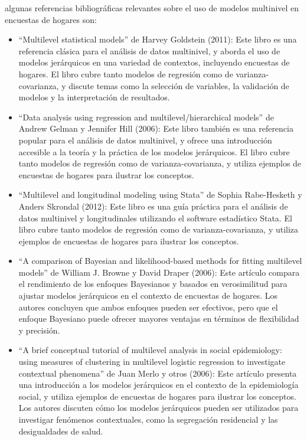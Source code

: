 \documentclass[
  spanish,
  12pt,
]{book}
\begin{document}
algunas referencias bibliográficas relevantes sobre el uso de modelos multinivel en encuestas de hogares son:

\begin{itemize}
\item
  ``Multilevel statistical models'' de Harvey Goldstein (2011): Este libro es una referencia clásica para el análisis de datos multinivel, y aborda el uso de modelos jerárquicos en una variedad de contextos, incluyendo encuestas de hogares. El libro cubre tanto modelos de regresión como de varianza-covarianza, y discute temas como la selección de variables, la validación de modelos y la interpretación de resultados.
\item
  ``Data analysis using regression and multilevel/hierarchical models'' de Andrew Gelman y Jennifer Hill (2006): Este libro también es una referencia popular para el análisis de datos multinivel, y ofrece una introducción accesible a la teoría y la práctica de los modelos jerárquicos. El libro cubre tanto modelos de regresión como de varianza-covarianza, y utiliza ejemplos de encuestas de hogares para ilustrar los conceptos.
\item
  ``Multilevel and longitudinal modeling using Stata'' de Sophia Rabe-Hesketh y Anders Skrondal (2012): Este libro es una guía práctica para el análisis de datos multinivel y longitudinales utilizando el software estadístico Stata. El libro cubre tanto modelos de regresión como de varianza-covarianza, y utiliza ejemplos de encuestas de hogares para ilustrar los conceptos.
\item
  ``A comparison of Bayesian and likelihood-based methods for fitting multilevel models'' de William J. Browne y David Draper (2006): Este artículo compara el rendimiento de los enfoques Bayesianos y basados en verosimilitud para ajustar modelos jerárquicos en el contexto de encuestas de hogares. Los autores concluyen que ambos enfoques pueden ser efectivos, pero que el enfoque Bayesiano puede ofrecer mayores ventajas en términos de flexibilidad y precisión.
\item
  ``A brief conceptual tutorial of multilevel analysis in social epidemiology: using measures of clustering in multilevel logistic regression to investigate contextual phenomena'' de Juan Merlo y otros (2006): Este artículo presenta una introducción a los modelos jerárquicos en el contexto de la epidemiología social, y utiliza ejemplos de encuestas de hogares para ilustrar los conceptos. Los autores discuten cómo los modelos jerárquicos pueden ser utilizados para investigar fenómenos contextuales, como la segregación residencial y las desigualdades de salud.
\end{itemize}
\end{document}
